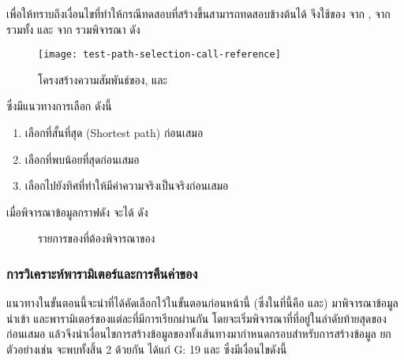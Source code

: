 เพื่อให้ทราบถึงเงื่อนไขที่ทำให้กรณีทดสอบที่สร้างขึ้นสามารถทดสอบ{\TestPath}ข้างต้นได้ จึงใช้{\cfg}ของ{\method}  จาก{\class} , 
{\method}  จาก{\class}  รวมทั้ง{\method}  และ  จาก{\class} 
รวมพิจารณา ดัง

\begin{figure}[h!]
    \texttt{[image: test-path-selection-call-reference]}
    \caption{โครงสร้างความสัมพันธ์ของ\class {},  และ}
    \label{fig:callreferences}
\end{figure}

\newpage
ซึ่งมีแนวทางการเลือก{\TestPath} ดังนี้
\begin{enumerate}
    \item เลือก{\TestPath}ที่สั้นที่สุด (Shortest path) ก่อนเสมอ
    \item เลือก{\TestPath}ที่พบ{\PredicateNode}น้อยที่สุดก่อนเสมอ
    \item เลือก{\TestPath}ไปยังทิศที่ทำให้{\PredicateNode}มีค่าความจริงเป็นจริงก่อนเสมอ
\end{enumerate}

เมื่อพิจารณาข้อมูลกราฟดัง  จะได้{\TestPath}  ดัง
\begin{figure}
    \centering
    \caption{รายการของ{\Node}ที่ต้องพิจารณาของ{\TestPath} }
    \label{fig:exampleTestPathP1}
\end{figure}

\subsubsection{การวิเคราะห์พารามิเตอร์และการคืนค่าของ{\method}}

แนวทางในขั้นตอนนี้จะนำ{\TestPath}ที่ได้คัดเลือกไว้ในขั้นตอนก่อนหน้านี้ (ซึ่งในที่นี้คือ  และ) มาพิจารณาข้อมูลนำเข้า
และพารามิเตอร์ของแต่ละ{\method}ที่มีการเรียกผ่านกัน โดยจะเริ่มพิจารณาที่{\PredicateNode}ที่อยู่ในลำดับท้ายสุดของ{\TestPath}ก่อนเสมอ 
แล้วจึงนำเงื่อนไขการสร้างข้อมูลของทั้งเส้นทางมากำหนดกรอบสำหรับการสร้างข้อมูล 
ยกตัวอย่างเช่น  จะพบ{\PredicateNode}ทั้งสิ้น 2 {\Node} ด้วยกัน ได้แก่ {G: 19} และ 
ซึ่งมีเงื่อนไขดังนี้

